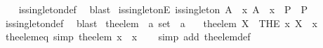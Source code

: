 \begin{isabellebody}
%
\isadelimproof
\ \ %
\endisadelimproof
%
\isatagproof
{}\isamarkupfalse%
\ is{\isacharunderscore}{\kern0pt}singleton{\isacharunderscore}{\kern0pt}def\ \isamarkupfalse%
\ blast%
\endisatagproof
{\isafoldproof}%
%
\isadelimproof
\isanewline
%
\endisadelimproof
\isanewline
{}\isamarkupfalse%
\ is{\isacharunderscore}{\kern0pt}singletonE{\isacharcolon}{\kern0pt}\ {\isachardoublequoteopen}is{\isacharunderscore}{\kern0pt}singleton\ A\ {\isasymLongrightarrow}\ {\isacharparenleft}{\kern0pt}{\isasymAnd}x{\isachardot}{\kern0pt}\ A\ {\isacharequal}{\kern0pt}\ {\isacharbraceleft}{\kern0pt}x{\isacharbraceright}{\kern0pt}\ {\isasymLongrightarrow}\ P{\isacharparenright}{\kern0pt}\ {\isasymLongrightarrow}\ P{\isachardoublequoteclose}\isanewline
%
\isadelimproof
\ \ %
\endisadelimproof
%
\isatagproof
{}\isamarkupfalse%
\ is{\isacharunderscore}{\kern0pt}singleton{\isacharunderscore}{\kern0pt}def\ \isamarkupfalse%
\ blast%
\endisatagproof
{\isafoldproof}%
%
\isadelimproof
%
\endisadelimproof
%
\isadelimdocument
%
\endisadelimdocument
%
\isatagdocument
%
\isamarkuptrue%
%
\endisatagdocument
{\isafolddocument}%
%
\isadelimdocument
%
\endisadelimdocument
{}\isamarkupfalse%
\ the{\isacharunderscore}{\kern0pt}elem\ {\isacharcolon}{\kern0pt}{\isacharcolon}{\kern0pt}\ {\isachardoublequoteopen}{\isacharprime}{\kern0pt}a\ set\ {\isasymRightarrow}\ {\isacharprime}{\kern0pt}a{\isachardoublequoteclose}\isanewline
\ \ \ {\isachardoublequoteopen}the{\isacharunderscore}{\kern0pt}elem\ X\ {\isacharequal}{\kern0pt}\ {\isacharparenleft}{\kern0pt}THE\ x{\isachardot}{\kern0pt}\ X\ {\isacharequal}{\kern0pt}\ {\isacharbraceleft}{\kern0pt}x{\isacharbraceright}{\kern0pt}{\isacharparenright}{\kern0pt}{\isachardoublequoteclose}\isanewline
\isanewline
{}\isamarkupfalse%
\ the{\isacharunderscore}{\kern0pt}elem{\isacharunderscore}{\kern0pt}eq\ {\isacharbrackleft}{\kern0pt}simp{\isacharbrackright}{\kern0pt}{\isacharcolon}{\kern0pt}\ {\isachardoublequoteopen}the{\isacharunderscore}{\kern0pt}elem\ {\isacharbraceleft}{\kern0pt}x{\isacharbraceright}{\kern0pt}\ {\isacharequal}{\kern0pt}\ x{\isachardoublequoteclose}\isanewline
%
\isadelimproof
\ \ %
\endisadelimproof
%
\isatagproof
{}\isamarkupfalse%
\ {\isacharparenleft}{\kern0pt}simp\ add{\isacharcolon}{\kern0pt}\ the{\isacharunderscore}{\kern0pt}elem{\isacharunderscore}{\kern0pt}def{\isacharparenright}{\kern0pt}%
\endisatagproof
{\isafoldproof}%

\end{isabellebody}
